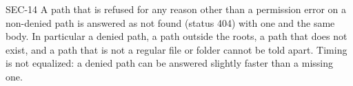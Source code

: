 \begin{req}{SEC-14}
A path that is refused for any reason other than a permission error on a
non-denied path is answered as not found (status 404) with one and the same body.  In
particular a denied path, a path outside the roots, a path that does not exist, and a
path that is not a regular file or folder cannot be told apart.  Timing is not
equalized: a denied path can be answered slightly faster than a missing one.
\end{req}
